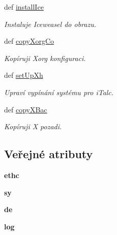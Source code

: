 \begin{DoxyCompactItemize}
def \hyperlink{classConfSys_1_1ConfSys_a75c24373b7f98875cb36979db32affb6}{install\-Ice}
\begin{DoxyCompactList}\small\item\em Instaluje Iceweasel do obrazu. \end{DoxyCompactList}\item 
def \hyperlink{classConfSys_1_1ConfSys_ac1ae7ecf353bc1fd45635bdca5d7b3bc}{copy\-Xorg\-Co}
\begin{DoxyCompactList}\small\item\em Kopíruji Xorg konfiguraci. \end{DoxyCompactList}\item 
def \hyperlink{classConfSys_1_1ConfSys_a9f6f935bb49c6cbdf8dab640c0b9b33f}{set\-Up\-Xh}
\begin{DoxyCompactList}\small\item\em Upraví vypínání systému pro i\-Talc. \end{DoxyCompactList}\item 
def \hyperlink{classConfSys_1_1ConfSys_a56c578bb874bfb2b0b3da19361ddf84b}{copy\-X\-Bac}
\begin{DoxyCompactList}\small\item\em Kopíruji X pozadi. \end{DoxyCompactList}\end{DoxyCompactItemize}
\subsection*{Veřejné atributy}
\begin{DoxyCompactItemize}
\item 
\hypertarget{classConfSys_1_1ConfSys_a3891a67e1d17ca6f09fdce5900814744}{{\bfseries ethc}}\label{d0/d38/classConfSys_1_1ConfSys_a3891a67e1d17ca6f09fdce5900814744}

\item 
\hypertarget{classConfSys_1_1ConfSys_a2af86ea0867572d5198dcf34487956cb}{{\bfseries sy}}\label{d0/d38/classConfSys_1_1ConfSys_a2af86ea0867572d5198dcf34487956cb}

\item 
\hypertarget{classConfSys_1_1ConfSys_aa15e4de0e14964b1c7c0c39eb70f4d0d}{{\bfseries de}}\label{d0/d38/classConfSys_1_1ConfSys_aa15e4de0e14964b1c7c0c39eb70f4d0d}

\item 
\hypertarget{classConfSys_1_1ConfSys_a0e588aeaddcbe3c98a1128c6865d4839}{{\bfseries log}}\label{d0/d38/classConfSys_1_1ConfSys_a0e588aeaddcbe3c98a1128c6865d4839}

\end{DoxyCompactItemize}


